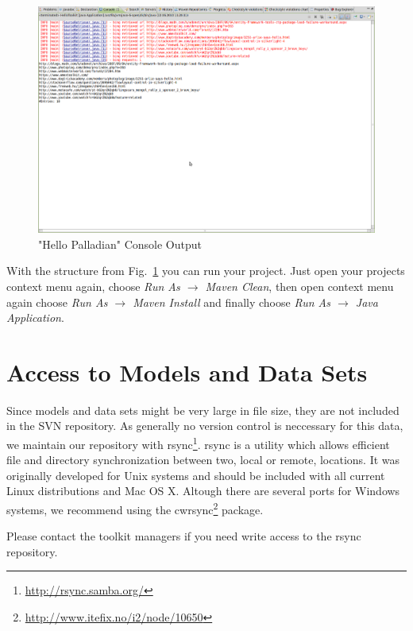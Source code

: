 \documentclass[a4paper,twoside]{book}      %
\begin{document}
\begin{figure}
\centering
\includegraphics[trim=0 550px 100px 0,clip=true,width=\textwidth]{img/ht14.png}
\caption{"Hello Palladian" Console Output}
\label{fig:structure}
\end{figure}
With the structure from Fig.~\ref{fig:structure} you can run your project. Just open your projects context menu again, choose \textit{Run As $\rightarrow$ Maven Clean}, then open context menu again choose \textit{Run As $\rightarrow$ Maven Install} and finally choose \textit{Run As $\rightarrow$ Java Application}.

\section{Access to Models and Data Sets} \label{sec:AccessModelsDataSets}

Since models and data sets might be very large in file size, they are not included in the SVN repository. As generally no version control is neccessary for this data, we maintain our repository with rsync\footnote{\url{http://rsync.samba.org/}}. rsync is a utility which allows efficient file and directory synchronization between two, local or remote, locations. It was originally developed for Unix systems and should be included with all current Linux distributions and Mac OS X. Altough there are several ports for Windows systems, we recommend using the cwrsync\footnote{\url{http://www.itefix.no/i2/node/10650}} package.


Please contact the toolkit managers if you need write access to the rsync repository.
\end{document}
